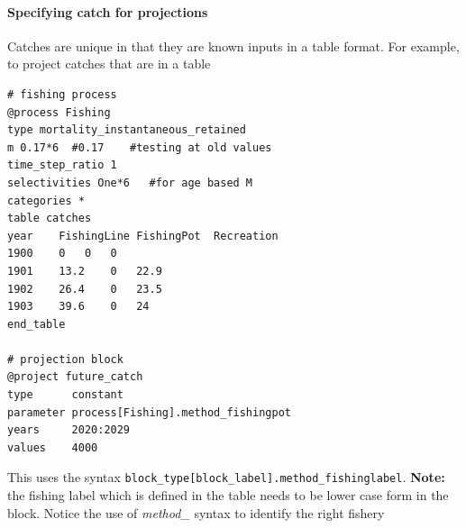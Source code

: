\paragraph[Catches]{Specifying catch for projections }\label{Projections@Catches}

Catches are unique in that they are known inputs in a table format. For example, to project catches that are in a table

{\small{\begin{verbatim}
# fishing process
@process Fishing
type mortality_instantaneous_retained
m 0.17*6  #0.17    #testing at old values
time_step_ratio 1
selectivities One*6   #for age based M
categories *
table catches
year	FishingLine	FishingPot	Recreation
1900	0	0	0
1901	13.2	0	22.9
1902	26.4	0	23.5
1903	39.6	0	24
end_table

# projection block
@project future_catch
type      constant
parameter process[Fishing].method_fishingpot
years     2020:2029
values    4000
\end{verbatim}}}

This uses the syntax \texttt{block\_type[block\_label].method\_fishinglabel}. \textbf{Note:} the fishing label which is defined in the table needs to be lower case form in the  block. Notice the use of \textit{method\_} syntax to identify the right fishery
